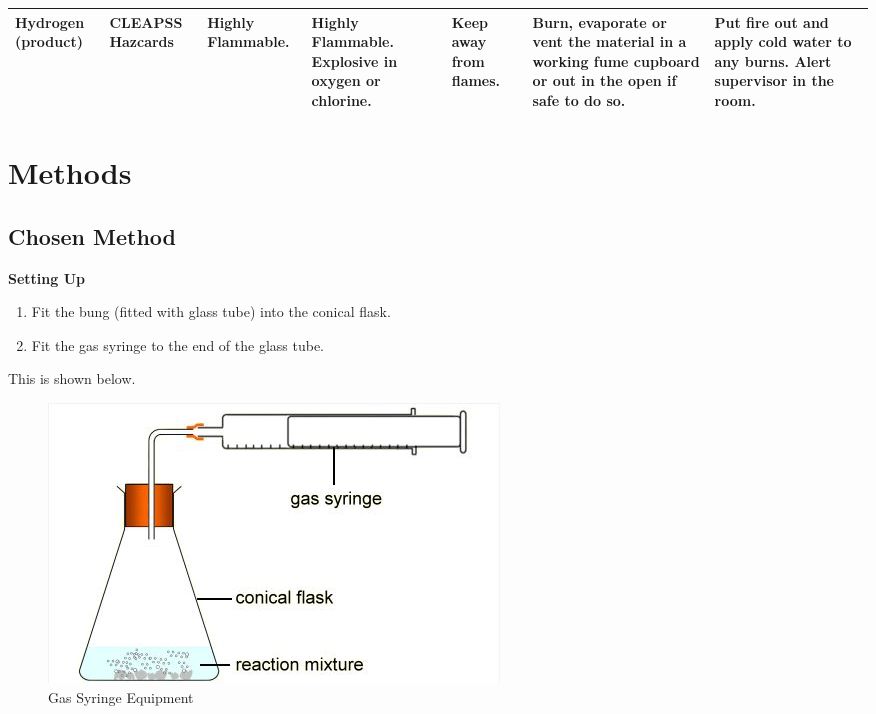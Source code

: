 \begin{landscape}
\begin{center}
\begin{longtable}{|p{1.5cm}|p{1.5cm}|p{3cm}|p{3cm}|p{3cm}|p{3cm}|p{2cm}|}
\\ \hline

Hydrogen (product) &
CLEAPSS Hazcards
& Highly Flammable.
& Highly Flammable. Explosive in oxygen or chlorine. 
& Keep away from flames.
& Burn, evaporate or vent the material in a working fume cupboard or out in the open if safe to do so.
& Put fire out and apply cold water to any burns. Alert supervisor in the room.

\\ \hline



\end{longtable}
\label{tab:Risk Assessment Table}

\end{center}


\end{landscape}


\section{Methods}

	\subsection{Chosen Method} \label{Chosen Method}

\textbf{Setting Up}

\begin{enumerate}
\item Fit the bung (fitted with glass tube) into the conical flask.
\item Fit the gas syringe to the end of the glass tube.
\end{enumerate}
This is shown below.
\begin{figure}[H]
    \includegraphics[width=\textwidth]{./Planning/Images/GasSyringe.jpg}
    \caption{Gas Syringe Equipment} \label{fig:Gas Syringe}
\end{figure}

